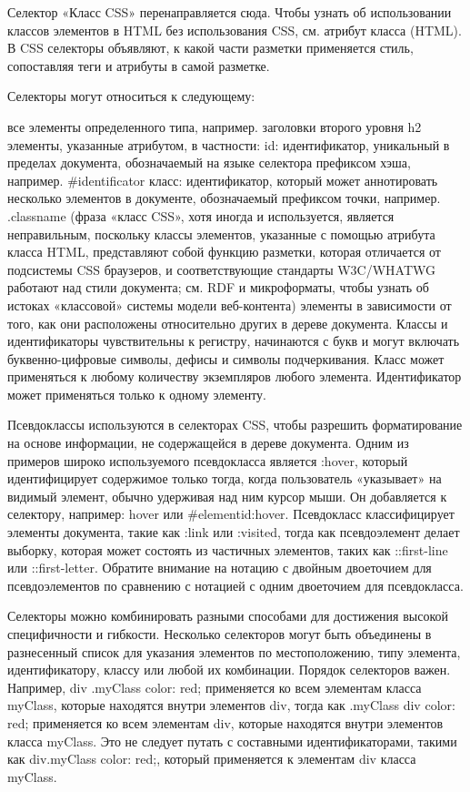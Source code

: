 Селектор
«Класс CSS» перенаправляется сюда. Чтобы узнать об использовании классов элементов в HTML без использования CSS, см. атрибут класса (HTML).
В CSS селекторы объявляют, к какой части разметки применяется стиль, сопоставляя теги и атрибуты в самой разметке.

Селекторы могут относиться к следующему:

все элементы определенного типа, например. заголовки второго уровня h2
элементы, указанные атрибутом, в частности:
id: идентификатор, уникальный в пределах документа, обозначаемый на языке селектора префиксом хэша, например. \#identificator
класс: идентификатор, который может аннотировать несколько элементов в документе, обозначаемый префиксом точки, например. .classname (фраза «класс CSS», хотя иногда и используется, является неправильным, поскольку классы элементов, указанные с помощью атрибута класса HTML, представляют собой функцию разметки, которая отличается от подсистемы CSS браузеров, и соответствующие стандарты W3C/WHATWG работают над стили документа; см. RDF и микроформаты, чтобы узнать об истоках «классовой» системы модели веб-контента)
элементы в зависимости от того, как они расположены относительно других в дереве документа.
Классы и идентификаторы чувствительны к регистру, начинаются с букв и могут включать буквенно-цифровые символы, дефисы и символы подчеркивания. Класс может применяться к любому количеству экземпляров любого элемента. Идентификатор может применяться только к одному элементу.

Псевдоклассы используются в селекторах CSS, чтобы разрешить форматирование на основе информации, не содержащейся в дереве документа. Одним из примеров широко используемого псевдокласса является :hover, который идентифицирует содержимое только тогда, когда пользователь «указывает» на видимый элемент, обычно удерживая над ним курсор мыши. Он добавляется к селектору, например: hover или \#elementid:hover. Псевдокласс классифицирует элементы документа, такие как :link или :visited, тогда как псевдоэлемент делает выборку, которая может состоять из частичных элементов, таких как ::first-line или ::first-letter. Обратите внимание на нотацию с двойным двоеточием для псевдоэлементов по сравнению с нотацией с одним двоеточием для псевдокласса.

Селекторы можно комбинировать разными способами для достижения высокой специфичности и гибкости. Несколько селекторов могут быть объединены в разнесенный список для указания элементов по местоположению, типу элемента, идентификатору, классу или любой их комбинации. Порядок селекторов важен. Например, div .myClass {color: red;} применяется ко всем элементам класса myClass, которые находятся внутри элементов div, тогда как .myClass div {color: red;} применяется ко всем элементам div, которые находятся внутри элементов класса myClass. Это не следует путать с составными идентификаторами, такими как div.myClass {color: red;}, который применяется к элементам div класса myClass.

